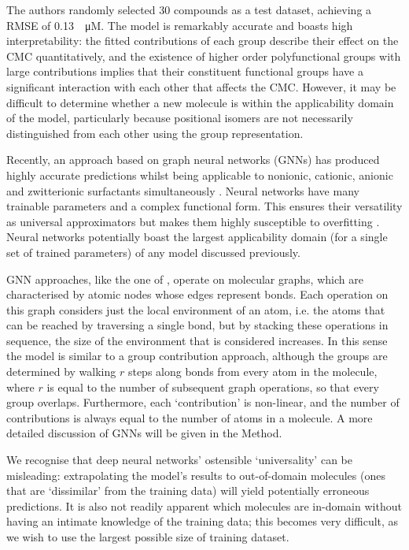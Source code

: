 The authors randomly selected 30 compounds as a test dataset, achieving a RMSE
of \SI{0.13}{\log \micro M}. The model is remarkably accurate and boasts high
interpretability: the fitted contributions of each group describe their effect
on the CMC quantitatively, and the existence of higher order polyfunctional
groups with large contributions implies that their constituent functional groups
have a significant interaction with each other that affects the CMC. However, it
may be difficult to determine whether a new molecule is within the applicability
domain of the model, particularly because positional isomers are not necessarily
distinguished from each other using the group representation.

Recently, an approach based on graph neural networks (GNNs) has produced highly
accurate predictions whilst being applicable to nonionic, cationic, anionic and
zwitterionic surfactants simultaneously \cite{qinPredictingCriticalMicelle2021}.
Neural networks have many trainable parameters and a complex functional form.
This ensures their versatility as universal approximators but makes them highly
susceptible to overfitting \cite{bejaniSystematicReviewOverfitting2021}. Neural
networks potentially boast the largest applicability domain (for a single set of
trained parameters) of any model discussed previously.

GNN approaches, like the one of \citet{qinPredictingCriticalMicelle2021},
operate on molecular graphs, which are characterised by atomic nodes whose edges
represent bonds. Each operation on this graph considers just the local
environment of an atom, i.e. the atoms that can be reached by traversing a
single bond, but by stacking these operations in sequence, the size of the
environment that is considered increases. In this sense the model is similar to
a group contribution approach, although the groups are determined by walking $r$
steps along bonds from every atom in the molecule, where $r$ is equal to the
number of subsequent graph operations, so that every group overlaps.
Furthermore, each `contribution' is non-linear, and the number of contributions
is always equal to the number of atoms in a molecule. A more detailed discussion
of GNNs will be given in the Method.

We recognise that deep neural networks' ostensible `universality' can be
misleading: extrapolating the model's results to out-of-domain molecules (ones
that are `dissimilar' from the training data) will yield potentially erroneous
predictions. It is also not readily apparent which molecules are in-domain
without having an intimate knowledge of the training data; this becomes very
difficult, as we wish to use the largest possible size of training dataset.
